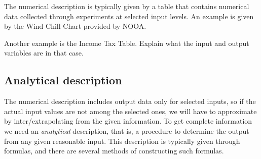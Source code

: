 The numerical description is typically given by a table
that contains numerical data collected through experiments
at selected input levels. An example is given by the
Wind Chill Chart provided by NOOA.


Another example is the Income Tax Table. Explain what the
input and output variables are in that case.

\subsection{Analytical description} The numerical
description includes output data only for selected inputs,
so if the actual input values are not among the selected
ones, we will have to approximate by inter/extrapolating
from the given information. To get complete information
we need an \emph{analytical} description, that is, a
procedure to determine the output from any given reasonable
input. This description is typically given through
formulas, and there are several methods of constructing
such formulas.

